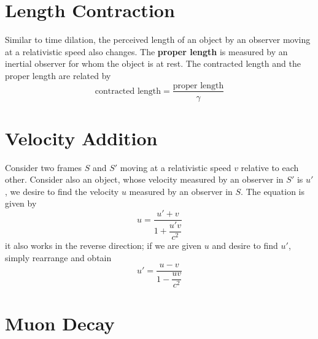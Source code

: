 \documentclass[a4paper,12pt]{article}
\let\oldsection\section
\renewcommand\section{\clearpage\oldsection}
\begin{document}
\section{Length Contraction}

Similar to time dilation, the perceived length of an object by an observer moving at a relativistic speed also changes. The \textbf{proper length} is measured by an inertial observer for whom the object is at rest. The contracted length and the proper length are related by
\begin{equation}
  \text{contracted length} = \frac{\text{proper length}}{\gamma}
\end{equation}

\section{Velocity Addition}

Consider two frames $S$ and $S'$ moving at a relativistic speed $v$ relative to each other. Consider also an object, whose velocity measured by an observer in $S'$ is $u'$, we desire to find the velocity $u$ measured by an observer in $S$. The equation is given by
$$u = \frac{u' + v}{1 + \dfrac{u'v}{c^2}}$$
it also works in the reverse direction; if we are given $u$ and desire to find $u'$, simply rearrange and obtain
$$u' = \frac{u - v}{1 - \dfrac{uv}{c^2}}$$

\section{Muon Decay}
\end{document}
